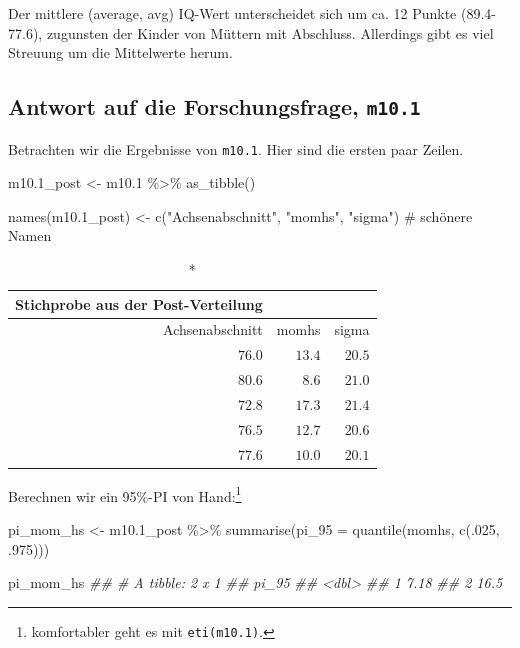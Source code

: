 \documentclass[
  a4paper,
  DIV=11]{scrreprt}
\newenvironment{Shaded}{\begin{snugshade}}{\end{snugshade}}
\newcommand{\AttributeTok}[1]{\textcolor[rgb]{0.40,0.45,0.13}{#1}}
\newcommand{\CommentTok}[1]{\textcolor[rgb]{0.37,0.37,0.37}{#1}}
\newcommand{\DecValTok}[1]{\textcolor[rgb]{0.68,0.00,0.00}{#1}}
\newcommand{\DocumentationTok}[1]{\textcolor[rgb]{0.37,0.37,0.37}{\textit{#1}}}
\newcommand{\FloatTok}[1]{\textcolor[rgb]{0.68,0.00,0.00}{#1}}
\newcommand{\FunctionTok}[1]{\textcolor[rgb]{0.28,0.35,0.67}{#1}}
\newcommand{\NormalTok}[1]{\textcolor[rgb]{0.00,0.23,0.31}{#1}}
\newcommand{\OtherTok}[1]{\textcolor[rgb]{0.00,0.23,0.31}{#1}}
\newcommand{\SpecialCharTok}[1]{\textcolor[rgb]{0.37,0.37,0.37}{#1}}
\newcommand{\StringTok}[1]{\textcolor[rgb]{0.13,0.47,0.30}{#1}}
\theoremstyle{definition}
\theoremstyle{remark}
\begin{document}
Der mittlere (average, avg) IQ-Wert unterscheidet sich um ca. 12 Punkte
(89.4-77.6), zugunsten der Kinder von Müttern mit Abschluss. Allerdings
gibt es viel Streuung um die Mittelwerte herum.

\hypertarget{antwort-auf-die-forschungsfrage-m10.1}{%
\subsection{\texorpdfstring{Antwort auf die Forschungsfrage,
\texttt{m10.1}}{Antwort auf die Forschungsfrage, m10.1}}\label{antwort-auf-die-forschungsfrage-m10.1}}

Betrachten wir die Ergebnisse von \texttt{m10.1}. Hier sind die ersten
paar Zeilen.

\begin{Shaded}
\begin{Highlighting}[]
\NormalTok{m10}\FloatTok{.1}\NormalTok{\_post }\OtherTok{\textless{}{-}}
\NormalTok{  m10}\FloatTok{.1} \SpecialCharTok{\%\textgreater{}\%} 
  \FunctionTok{as\_tibble}\NormalTok{() }

\FunctionTok{names}\NormalTok{(m10}\FloatTok{.1}\NormalTok{\_post) }\OtherTok{\textless{}{-}} \FunctionTok{c}\NormalTok{(}\StringTok{"Achsenabschnitt"}\NormalTok{, }\StringTok{"momhs"}\NormalTok{, }\StringTok{"sigma"}\NormalTok{)  }\CommentTok{\# schönere Namen}
\end{Highlighting}
\end{Shaded}

\begin{longtable}{rrr}
\caption*{
{\large Stichprobe aus der Post-Verteilung}
} \\ 
\toprule
Achsenabschnitt & momhs & sigma \\ 
\midrule
$76.0$ & $13.4$ & $20.5$ \\ 
$80.6$ & $8.6$ & $21.0$ \\ 
$72.8$ & $17.3$ & $21.4$ \\ 
$76.5$ & $12.7$ & $20.6$ \\ 
$77.6$ & $10.0$ & $20.1$ \\ 
\bottomrule
\end{longtable}

Berechnen wir ein 95\%-PI von Hand:\footnote{komfortabler geht es mit
  \texttt{eti(m10.1)}.}

\begin{Shaded}
\begin{Highlighting}[]
\NormalTok{pi\_mom\_hs }\OtherTok{\textless{}{-}}
\NormalTok{  m10}\FloatTok{.1}\NormalTok{\_post }\SpecialCharTok{\%\textgreater{}\%} 
  \FunctionTok{summarise}\NormalTok{(}\AttributeTok{pi\_95 =} \FunctionTok{quantile}\NormalTok{(momhs, }\FunctionTok{c}\NormalTok{(.}\DecValTok{025}\NormalTok{, .}\DecValTok{975}\NormalTok{)))}

\NormalTok{pi\_mom\_hs}
\DocumentationTok{\#\# \# A tibble: 2 x 1}
\DocumentationTok{\#\#   pi\_95}
\DocumentationTok{\#\#   \textless{}dbl\textgreater{}}
\DocumentationTok{\#\# 1  7.18}
\DocumentationTok{\#\# 2 16.5}
\end{Highlighting}
\end{Shaded}
\end{document}
